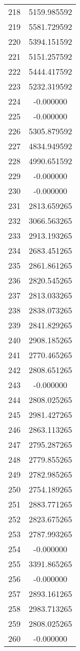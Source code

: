 \documentclass[12pt]{article}
\begin{document}
\begin{longtable}{@{}cc@{}}
218 & 5159.985592 \\
219 & 5581.729592 \\
220 & 5394.151592 \\
221 & 5151.257592 \\
222 & 5444.417592 \\
223 & 5232.319592 \\
224 & -0.000000 \\
225 & -0.000000 \\
226 & 5305.879592 \\
227 & 4834.949592 \\
228 & 4990.651592 \\
229 & -0.000000 \\
230 & -0.000000 \\
231 & 2813.659265 \\
232 & 3066.563265 \\
233 & 2913.193265 \\
234 & 2683.451265 \\
235 & 2861.861265 \\
236 & 2820.545265 \\
237 & 2813.033265 \\
238 & 2838.073265 \\
239 & 2841.829265 \\
240 & 2908.185265 \\
241 & 2770.465265 \\
242 & 2808.651265 \\
243 & -0.000000 \\
244 & 2808.025265 \\
245 & 2981.427265 \\
246 & 2863.113265 \\
247 & 2795.287265 \\
248 & 2779.855265 \\
249 & 2782.985265 \\
250 & 2754.189265 \\
251 & 2883.771265 \\
252 & 2823.675265 \\
253 & 2787.993265 \\
254 & -0.000000 \\
255 & 3391.865265 \\
256 & -0.000000 \\
257 & 2893.161265 \\
258 & 2983.713265 \\
259 & 2808.025265 \\
260 & -0.000000 \\

\end{longtable}
\end{document}
